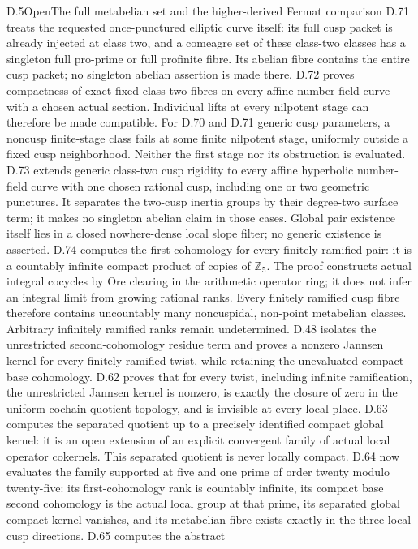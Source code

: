 \begin{statement}{D.5}{Open}{The full metabelian set and the higher-derived Fermat comparison}
D.71 treats the requested once-punctured elliptic
curve itself: its full cusp packet is already
injected at class two, and a comeagre set of
these class-two classes has a singleton full
pro-prime or full profinite fibre. Its abelian
fibre contains the entire cusp packet; no
singleton abelian assertion is made there.
D.72 proves compactness of exact fixed-class-two
fibres on every affine number-field curve with
a chosen actual section. Individual lifts at
every nilpotent stage can therefore be made
compatible. For D.70 and D.71 generic cusp
parameters, a noncusp finite-stage class fails
at some finite nilpotent stage, uniformly
outside a fixed cusp neighborhood. Neither
the first stage nor its obstruction is evaluated.
D.73 extends generic class-two cusp rigidity
to every affine hyperbolic number-field curve
with one chosen rational cusp, including one
or two geometric punctures. It separates the
two-cusp inertia groups by their degree-two
surface term; it makes no singleton abelian
claim in those cases.
Global pair existence itself lies in a closed
nowhere-dense local slope filter; no generic
existence is asserted.
D.74 computes the first cohomology for every finitely
ramified pair: it is a countably infinite compact product
of copies of \(\mathbb Z_5\). The proof constructs
actual integral cocycles by Ore clearing in the arithmetic
operator ring; it does not infer an integral limit from
growing rational ranks. Every finitely ramified cusp fibre
therefore contains uncountably many noncuspidal, non-point
metabelian classes. Arbitrary infinitely ramified ranks
remain undetermined. D.48 isolates the
unrestricted second-cohomology residue
term and proves a nonzero Jannsen
kernel for every finitely ramified
twist, while retaining the unevaluated
compact base cohomology. D.62 proves that
for every twist, including infinite ramification,
the unrestricted Jannsen kernel is nonzero,
is exactly the closure of zero in the uniform
cochain quotient topology, and is invisible
at every local place. D.63 computes the
separated quotient up to a precisely identified
compact global kernel: it is an open extension
of an explicit convergent family of actual
local operator cokernels. This separated
quotient is never locally compact. D.64 now
evaluates the family supported at five and
one prime of order twenty modulo twenty-five:
its first-cohomology rank is countably infinite,
its compact base second cohomology is the
actual local group at that prime, its separated
global compact kernel vanishes, and its
metabelian fibre exists exactly in the three
local cusp directions. D.65 computes the abstract

\end{statement}
